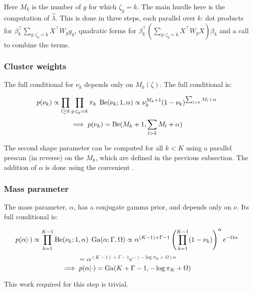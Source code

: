 Here $M_k$ is the number of $g$ for which $\zeta_g = k$. The main hurdle here is the computation of $\hat{\lambda}$. This is done in three steps, each parallel over $k$: dot products for $\beta_k^\top \sum_{g:\zeta_g=k}X^\top W_g y_g$, quadratic forms for $\beta_k^\top\left( \sum_{g:\zeta_g=k} X^\top W_g X \right) \beta_k$ and a  call to combine the terms.

\subsubsection{Cluster weights}
The full conditional for $\nu_k$ depends only on $M_k(\zeta)$. The full conditional is:

\begin{equation}
p(\nu_k) \propto \prod_{l \ge k} \prod_{g:\zeta_g=k} \pi_k \; \operatorname{Be}(\nu_k; 1, \alpha) \propto \nu_k^{M_k + 1}(1-\nu_k)^{\sum_{l > k} M_l + \alpha} 
\end{equation}
\begin{equation*}
\implies p(\nu_k)=\operatorname{Be}(M_k + 1, \sum_{l>k}M_l + \alpha)
\end{equation*}

The second shape parameter can be computed for all $k<K$ using a parallel prescan (in reverse) on the $M_k$, which are defined in the previous subsection. The addition of $\alpha$ is done using the convenient .

\subsubsection{Mass parameter}
The mass parameter, $\alpha$, has a conjugate gamma prior, and depends only on $\nu$. Its full conditional is:

\begin{equation}
p(\alpha|\cdot) \propto \prod_{k=1}^{K-1} \operatorname{Be}(\nu_k;1, \alpha) \; \operatorname{Ga}(\alpha;\Gamma,\Omega)
\propto \alpha^{(K-1) + \Gamma - 1} \left(\prod_{k=1}^{K-1} (1-\nu_k)\right)^\alpha e^{-\Omega \alpha} 
\end{equation}
\begin{equation*}
= \alpha^{(K-1) + \Gamma - 1} e^{-(-\log \pi_K + \Omega) \alpha}
\end{equation*}
\begin{equation*}
\implies p(\alpha|\cdot) = \operatorname{Ga}(K + \Gamma - 1, -\log \pi_K + \Omega)
\end{equation*}

This work required for this step is trivial.

